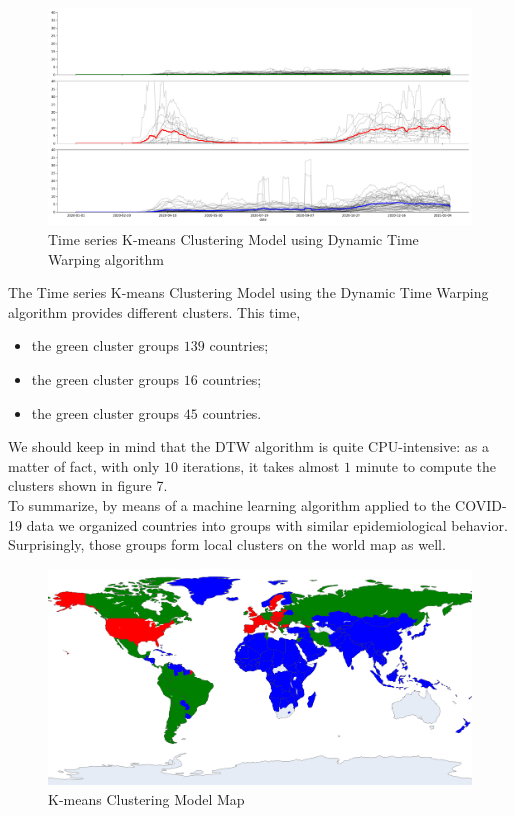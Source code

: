 \documentclass[11pt,a4paper]{article}
\begin{document}
\begin{figure}[H]
    \begin{center}
        \includegraphics[scale=0.32]{img/daily-deaths-dtw-clusters.pdf}
    \end{center}
    \caption{Time series K-means Clustering Model using Dynamic Time Warping algorithm}
\end{figure}
\noindent The Time series K-means Clustering Model using the Dynamic Time
Warping algorithm provides different clusters. This time,
\begin{itemize}
    \item the {\color{ForestGreen}green cluster} groups $139$ countries;
    \item the {\color{red}green cluster} groups $16$ countries;
    \item the {\color{blue}green cluster} groups $45$ countries.
\end{itemize}
We should keep in mind that the DTW algorithm is quite CPU-intensive: as a
matter of fact, with only $10$ iterations, it takes almost $1$ minute to
compute the clusters shown in figure 7.\\
To summarize, by means of a machine learning algorithm applied to the COVID-19
data we organized countries into groups with similar epidemiological behavior.
Surprisingly, those groups form local clusters on the world map as well.
\begin{figure}[H]
    \begin{center}
        \includegraphics[scale=0.9]{img/clusters-map.png}
    \end{center}
    \caption{K-means Clustering Model Map}
\end{figure}
\end{document}
